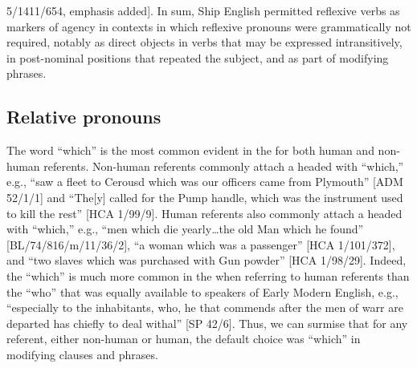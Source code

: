 5/1411/654, emphasis added]. In sum, Ship English permitted reflexive verbs as markers of  agency in contexts in which reflexive pronouns were grammatically not required, notably as direct objects in verbs that may be expressed intransitively, in post-nominal positions that repeated the subject, and as part of modifying phrases. 

\subsection{{Relative pronouns}}%

The word “which” is the most common  evident in the  for both human and non-human referents. Non-human  referents commonly attach a  headed with “which,” e.g., “saw a fleet to Cerousd which was our officers came from Plymouth” [ADM 52/1/1] and “The[y] called for the Pump handle, which was the instrument used to kill the rest” [HCA 1/99/9]. Human  referents also commonly attach a  headed with “which,” e.g., “men which die yearly…the old Man which he found” [BL/74/816/m/11/36/2], “a woman which was a passenger” [HCA 1/101/372], and “two slaves which was purchased with Gun powder” [HCA 1/98/29]. Indeed, the  “which” is much more common in the  when referring to human referents than the  “who” that was equally available to speakers of Early Modern English, e.g., “especially to the inhabitants, who, he that commends after the men of warr are departed has chiefly to deal withal” [SP 42/6]. Thus, we can surmise that for any  referent, either non-human or human, the default  choice was “which” in modifying clauses and phrases. 

